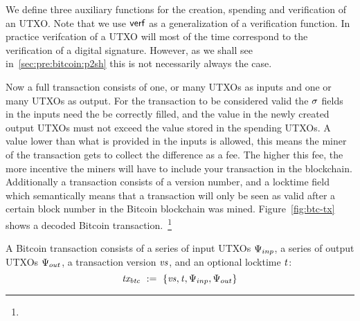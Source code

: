 We define three auxiliary functions for the creation, spending and verification of an UTXO.
Note that we use $\mathsf{verf}$ as a generalization of a verification function.
In practice verifcation of a UTXO will most of the time correspond to the verification of a digital signature.
However, as we shall see in~\ref{sec:pre:bitcoin:p2sh} this is not necessarily always the case.

\begin{center}
    \fbox{
    \begin{varwidth}{\textwidth}
        \procedure[linenumbering]{$\procCreateUTXO{\varValue}{\varScriptPubKey}$} {
        \pcreturn \varUTXO \opAssign \{ \varValue \opAssign \varValue, \varScriptPubKey \opAssign \varScriptPubKey,
        \varScriptSig \opAssign \cnstEmptySet \}
        } \\
        \procedure[linenumbering]{$\procSpendUTXO{\varUTXO}{\varScriptSig}$} {
        \{ \varValue, \varScriptPubKey \} \opFunResult \varUTXO \\
        \pcreturn \varUTXO \opAssign \{ \varValue \opAssign \varValue, \varScriptPubKey \opAssign \varScriptPubKey,
        \varScriptSig \opAssign \varScriptSig \}
        } \\
        \procedure[linenumbering]{$\procVerfUTXO{\varUTXO}$} {
        \{ \varValue, \varScriptPubKey, \varScriptSig \} \opFunResult \varUTXO \\
        \pcreturn \procVerf{\varScriptPubKey}{\varScriptSig}{\varValue}
        }
    \end{varwidth}
    }
\end{center}

Now a full transaction consists of one, or many UTXOs as inputs and one or many UTXOs as output.
For the transaction to be considered valid the $\mathit{\sigma}$ fields in the inputs need the be correctly filled, and the value in the newly created output UTXOs must not exceed the value stored in the spending UTXOs.
A value lower than what is provided in the inputs is allowed, this means the miner of the transaction gets to collect the difference as a fee.
The higher this fee, the more incentive the miners will have to include your transaction in the blockchain.
Additionally a transaction consists of a version number, and a locktime field which semantically means that a
transaction will only be seen as valid after a certain block number in the Bitcoin blockchain was mined.
Figure~\ref{fig:btc-tx} shows a decoded Bitcoin transaction.~\footnote{\urlbtcbook}

\begin{definition}
    A Bitcoin transaction consists of a series of input UTXOs $\Psi_{inp}$, a series of output UTXOs $\Psi_{out}$, a
    transaction version $\mathit{vs}$, and an optional locktime $\mathit{t}$:
    \[ \mathit{tx_{btc}} ~:=~ \{ \mathit{vs}, \mathit{t}, \Psi_{inp}, \Psi_{out} \} \]
\end{definition}

